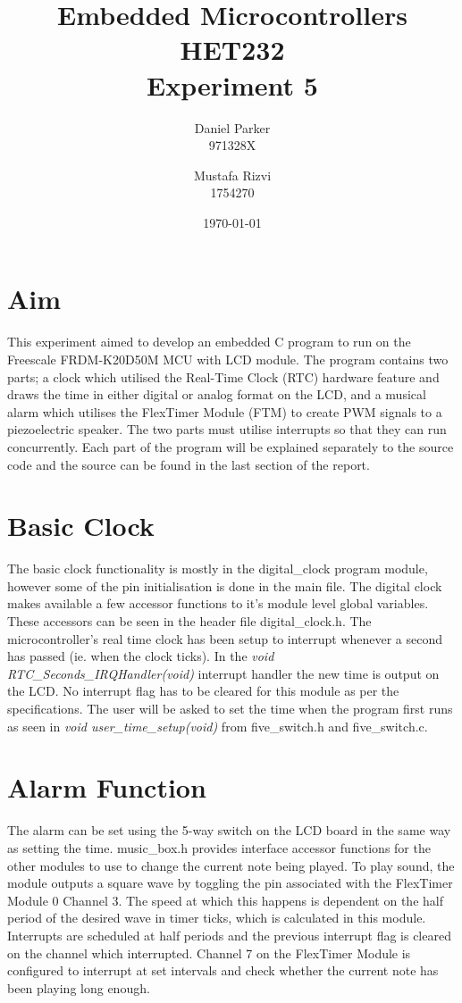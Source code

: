\documentclass{article}
\title{Embedded Microcontrollers HET232 \\ Experiment 5}
\author{Daniel Parker \\ 971328X \and Mustafa Rizvi \\ 1754270}
\date{\today}
\begin{document}
\maketitle
\section{Aim}
This experiment aimed to develop an embedded C program to run on the Freescale FRDM-K20D50M MCU with LCD module. The program contains two parts; a clock which utilised the Real-Time Clock (RTC) hardware feature and draws the time in either digital or analog format on the LCD, and a musical alarm which utilises the FlexTimer Module (FTM) to create PWM signals to a piezoelectric speaker. The two parts must utilise interrupts so that they can run concurrently. Each part of the program will be explained separately to the source code and the source can be found in the last section of the report.

\maketitle
\section{Basic Clock}
The basic clock functionality is mostly in the digital\_clock program module, however some of the pin initialisation is done in the main file. The digital clock makes available a few accessor functions to it's module level global variables. These accessors can be seen in the header file digital\_clock.h. The microcontroller's real time clock has been setup to interrupt whenever a second has passed (ie. when the clock ticks). In the \emph{void RTC\_Seconds\_IRQHandler(void)} interrupt handler the new time is output on the LCD. No interrupt flag has to be cleared for this module as per the specifications. The user will be asked to set the time when the program first runs as seen in \emph{void user\_time\_setup(void)} from five\_switch.h and five\_switch.c.

\maketitle
\section{Alarm Function}
The alarm can be set using the 5-way switch on the LCD board in the same way as setting the time. music\_box.h provides interface accessor functions for the other modules to use to change the current note being played. To play sound, the module outputs a square wave by toggling the pin associated with the FlexTimer Module 0 Channel 3. The speed at which this happens is dependent on the half period of the desired wave in timer ticks, which is calculated in this module. Interrupts are scheduled at half periods and the previous interrupt flag is cleared on the channel which interrupted. Channel 7 on the FlexTimer Module is configured to interrupt at set intervals and check whether the current note has been playing long enough. 
\end{document}
